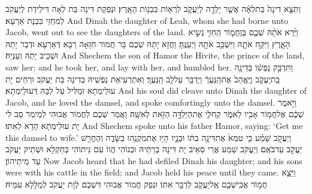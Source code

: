 \newperek
{}
{וַתֵּצֵ֤א דִינָה֙ בַּת\maqqaf לֵאָ֔ה אֲשֶׁ֥ר יָלְדָ֖ה לְיַעֲקֹ֑ב לִרְא֖וֹת בִּבְנ֥וֹת הָאָֽרֶץ׃}
{וּנְפַקַת דִּינָה בַּת לֵאָה דִּילֵידַת לְיַעֲקֹב לְמִחְזֵי בִּבְנָת אַרְעָא׃}
{And Dinah the daughter of Leah, whom she had borne unto Jacob, went out to see the daughters of the land.}{}
{וַיַּ֨רְא אֹתָ֜הּ שְׁכֶ֧ם בֶּן\maqqaf חֲמ֛וֹר הַֽחִוִּ֖י נְשִׂ֣יא הָאָ֑רֶץ וַיִּקַּ֥ח אֹתָ֛הּ וַיִּשְׁכַּ֥ב אֹתָ֖הּ וַיְעַנֶּֽהָ׃}
{וַחֲזָא יָתַהּ שְׁכֶם בַּר חֲמוֹר חִוָּאָה רַבָּא דְּאַרְעָא וּדְבַר יָתַהּ וּשְׁכֵיב יָתַהּ וְעַנְּיַהּ׃}
{And Shechem the son of Hamor the Hivite, the prince of the land, saw her; and he took her, and lay with her, and humbled her.}{}
{וַתִּדְבַּ֣ק נַפְשׁ֔וֹ בְּדִינָ֖ה בַּֽת\maqqaf יַעֲקֹ֑ב וַיֶּֽאֱהַב֙ אֶת\maqqaf הַֽנַּעֲרָ֔ וַיְדַבֵּ֖ר עַל\maqqaf לֵ֥ב הַֽנַּעֲרָֽ׃}
{וְאִתְרְעִיאַת נַפְשֵׁיהּ בְּדִינָה בַּת יַעֲקֹב וּרְחֵים יָת עוּלֵימְתָא וּמַלִּיל עַל לִבַּהּ דְּעוּלֵימְתָא׃}
{And his soul did cleave unto Dinah the daughter of Jacob, and he loved the damsel, and spoke comfortingly unto the damsel.}{}
{וַיֹּ֣אמֶר שְׁכֶ֔ם אֶל\maqqaf חֲמ֥וֹר אָבִ֖יו לֵאמֹ֑ר קַֽח\maqqaf לִ֛י אֶת\maqqaf הַיַּלְדָּ֥ה הַזֹּ֖את לְאִשָּֽׁה׃}
{וַאֲמַר שְׁכֶם לַחֲמוֹר אֲבוּהִי לְמֵימַר סַב לִי יָת עוּלֵימְתָא הָדָא לְאִתּוּ׃}
{And Shechem spoke unto his father Hamor, saying: ‘Get me this damsel to wife.’}{}
{וְיַעֲקֹ֣ב שָׁמַ֗ע כִּ֤י טִמֵּא֙ אֶת\maqqaf דִּינָ֣ה בִתּ֔וֹ וּבָנָ֛יו הָי֥וּ אֶת\maqqaf מִקְנֵ֖הוּ בַּשָּׂדֶ֑ה וְהֶחֱרִ֥שׁ יַעֲקֹ֖ב עַד\maqqaf בֹּאָֽם׃}
{וְיַעֲקֹב שְׁמַע אֲרֵי סַאֵיב יָת דִּינָה בְרַתֵּיהּ וּבְנוֹהִי הֲווֹ עִם גֵּיתוֹהִי בְּחַקְלָא וּשְׁתֵיק יַעֲקֹב עַד מֵיתֵיהוֹן׃}
{Now Jacob heard that he had defiled Dinah his daughter; and his sons were with his cattle in the field; and Jacob held his peace until they came.}{}
{וַיֵּצֵ֛א חֲמ֥וֹר אֲבִֽי\maqqaf שְׁכֶ֖ם אֶֽל\maqqaf יַעֲקֹ֑ב לְדַבֵּ֖ר אִתּֽוֹ׃}
{וּנְפַק חֲמוֹר אֲבוּהִי דִּשְׁכֶם לְוָת יַעֲקֹב לְמַלָּלָא עִמֵּיהּ׃}
